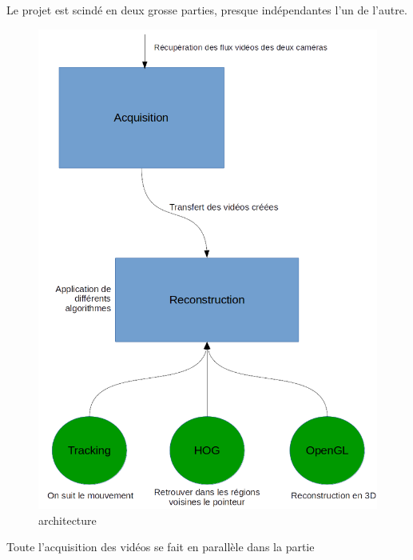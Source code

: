 Le projet est scindé en deux grosse parties, presque indépendantes l'un de l'autre.

\begin{figure}[!htb]
\centering
\includegraphics[width=\textwidth]{Modules/Picture/Architecture.png}
\caption{architecture}
\label{architecture}
\end{figure}

Toute l'acquisition des vidéos se fait en parallèle dans la partie 